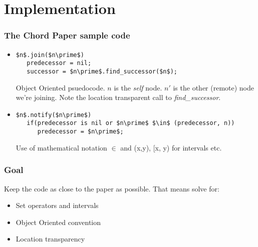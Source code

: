 \documentclass{beamer}
\begin{document}
\section{Implementation}
\begin{frame}[fragile]
  \frametitle{The Chord Paper sample code}
  \begin{itemize}
  \item
    \begin{lstlisting}[mathescape, style=pesudocode]
$n$.join($n\prime$)
   predecessor = nil;
   successor = $n\prime$.find_successor($n$);
    \end{lstlisting}
    Object Oriented psuedocode. \emph{$n$} is the \emph{self}
    node. \emph{$n\prime$} is the other (remote) node we're
    joining. Note the location transparent call to
    \emph{find\_successor}.

  \item 
    \begin{lstlisting}[mathescape, style=pesudocode]
$n$.notify($n\prime$)
   if(predecessor is nil or $n\prime$ $\in$ (predecessor, n))
      predecessor = $n\prime$;
    \end{lstlisting}
    Use of mathematical notation $\in$ and (x,y), [x, y) for intervals
      etc.
  \end{itemize}
\end{frame}

\begin{frame}
  \frametitle{Goal} Keep the code as close to the paper as
  possible. That means solve for:
  \begin{itemize}
  \item Set operators and intervals
  \item Object Oriented convention
  \item Location transparency
  \end{itemize}
\end{frame}
\end{document}
